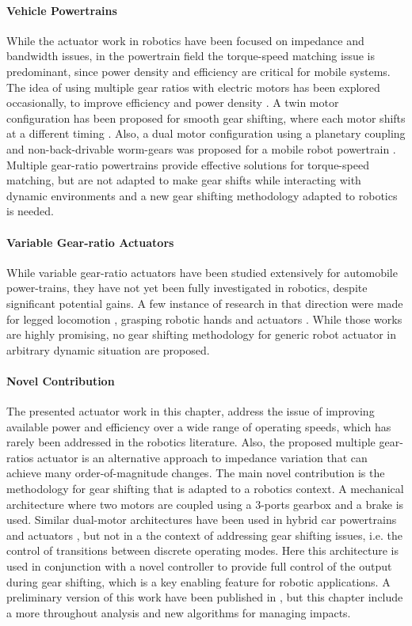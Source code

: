 \paragraph{Vehicle Powertrains} While the actuator work in robotics have been focused on impedance and bandwidth issues, in the powertrain field the torque-speed matching issue is predominant, since power density and efficiency are critical for mobile systems. The idea of using multiple gear ratios with electric motors has been explored occasionally, to improve efficiency and power density \cite{mckeegan_antonovs_2011}. A twin motor configuration has been proposed for smooth gear shifting, where each motor shifts at a different timing \cite{bologna_electric_2014}. Also, a dual motor configuration using a planetary coupling and non-back-drivable worm-gears was proposed for a mobile robot powertrain \cite{lee_new_2012}. Multiple gear-ratio powertrains provide effective solutions for torque-speed matching, but are not adapted to make gear shifts while interacting with dynamic environments and a new gear shifting methodology adapted to robotics is needed.

\paragraph{Variable Gear-ratio Actuators} 
While variable gear-ratio actuators have been studied extensively for automobile power-trains, they have not yet been fully investigated in robotics, despite significant potential gains. A few instance of research in that direction were made for legged locomotion \cite{hirose_design_1991}, grasping robotic hands \cite{shin_robot_2012} and actuators \cite{hirose_development_1999} \cite{byeong-sang_kim_improved_2007}\cite{tahara_high-backdrivable_2011}. While those works are highly promising, no gear shifting methodology for generic robot actuator in arbitrary dynamic situation are proposed. 

\paragraph{Novel Contribution} The presented actuator work in this chapter, address the issue of improving available power and efficiency over a wide range of operating speeds, which has rarely been addressed in the robotics literature. Also, the proposed multiple gear-ratios actuator is an alternative approach to impedance variation that can achieve many order-of-magnitude changes. The main novel contribution is the methodology for gear shifting that is adapted to a robotics context. A mechanical architecture where two motors are coupled using a 3-ports gearbox and a brake is used. Similar dual-motor architectures have been used in hybrid car powertrains and actuators , but not in a the context of addressing gear shifting issues, i.e. the control of transitions between discrete operating modes. Here this architecture is used in conjunction with a novel controller to provide full control of the output during gear shifting, which is a key enabling feature for robotic applications. A preliminary version of this work have been published in \cite{girard_two-speed_2015}, but this chapter include a more throughout analysis and new algorithms for managing impacts. 


